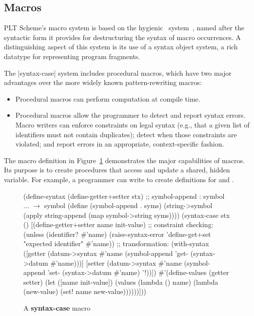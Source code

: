 \begin{schemeregion}
\section{Macros}
\label{sect:macros}

PLT Scheme's macro system is based on the
hygienic~\cite{cr:mtw,kffd:hygiene} 
system~\cite{dhb:sc}, named after the syntactic form it provides for
destructuring the syntax of macro occurrences. A distinguishing aspect
of this system is its use of a syntax object system, a rich datatype
for representing program fragments.

The \scheme|syntax-case| system includes procedural macros, which have
two major advantages over the more widely known pattern-rewriting
macros:

\begin{itemize}
\item
Procedural macros can perform computation at compile time.
\item
Procedural macros allow the programmer to detect and report syntax
errors. Macro writers can enforce constraints on legal syntax (e.g., that
a given list of identifiers must not contain duplicates); detect when
those constraints are violated; and report errors in an appropriate,
context-specific fashion. 
\end{itemize}

The macro definition in Figure~\ref{f:getset} demonstrates the major
capabilities of  macros. Its purpose is to create
procedures that access and update a shared, hidden variable.
%
For example, a programmer can write
 to create definitions for
 and .

\begin{figure}
\begin{schemedisplay}
(define-syntax (define-getter+setter stx)
  ;; symbol-append : symbol ... $\rightarrow$ symbol
  (define (symbol-append . syms)
    (string->symbol (apply string-append (map symbol->string syms))))
  (syntax-case stx ()
    [(define-getter+setter name init-value)
     ;; constraint checking:
     (unless (identifier? #'name)
       (raise-syntax-error 'define-get+set "expected identifier" #'name))
     ;; transformation:
     (with-syntax
         ([getter (datum->syntax
		   #'name
		   (symbol-append 'get- (syntax->datum #'name)))]
          [setter (datum->syntax
		   #'name
		   (symbol-append 'set- (syntax->datum #'name) '!))])
       #'(define-values (getter setter)
           (let ([name init-value])
             (values (lambda () name)
                     (lambda (new-value) (set! name new-value))))))]))
\end{schemedisplay}
\caption{A \textbf{syntax-case} macro}
\label{f:getset}
\end{figure}


\end{schemeregion}
